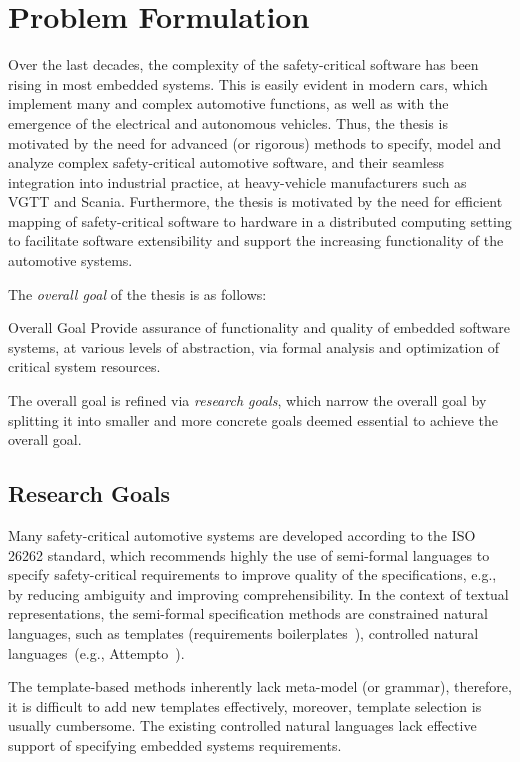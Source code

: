 \chapter{Problem Formulation}\label{ch_problem_formulation}
Over the last decades, the complexity of the safety-critical software has been rising in most embedded systems. This is easily evident in modern cars, which implement many and complex automotive functions, as well as with the emergence of the electrical and autonomous vehicles. Thus, the thesis is motivated by the need for advanced (or rigorous) methods to specify, model and analyze complex safety-critical automotive software, and their seamless integration into industrial practice, at heavy-vehicle manufacturers such as VGTT and Scania. Furthermore, the thesis is motivated by the need for efficient mapping of safety-critical software to hardware in a distributed computing setting to facilitate software extensibility and support the increasing functionality of the automotive systems. 

The \textit{overall goal} of the thesis is as follows:
\begin{mybox}[attach title to upper={\ ---\ }]{Overall Goal}
	Provide assurance of functionality and quality of embedded software systems, at various levels of abstraction, via formal analysis and optimization of critical system resources.
\end{mybox}

The overall goal is refined via \textit{research goals}, which narrow the overall goal by splitting it into smaller and more concrete goals deemed essential to achieve the overall goal. 

\section{Research Goals}\label{research_challenges}
Many safety-critical automotive systems are developed according to the ISO 26262 standard, which recommends highly the use of semi-formal languages to specify safety-critical requirements to improve quality of the specifications, e.g., by reducing ambiguity and improving comprehensibility. In the context of textual representations, the semi-formal specification methods are constrained natural languages, such as templates (requirements boilerplates~\cite{Farfeleder2011DODT:Development}\cite{Mahmud2015ReSA:Systems}), controlled natural languages~\cite{Kuhn2014ALanguages}(e.g., Attempto~\cite{attempto96}).

The template-based methods inherently lack meta-model (or grammar), therefore, it is difficult to add new templates effectively, moreover, template selection is usually cumbersome. The existing controlled natural languages lack effective support of specifying embedded systems requirements.

